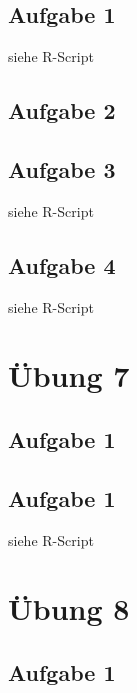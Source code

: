 \documentclass[13pt,a4paper]{article}
\begin{document}
\subsection{Aufgabe 1}
siehe R-Script

\subsection{Aufgabe 2}

\subsection{Aufgabe 3}
siehe R-Script

\subsection{Aufgabe 4}
siehe R-Script

\newpage
\section{Übung 7}
\subsection{Aufgabe 1}

\subsection{Aufgabe 1}
siehe R-Script

\newpage
\section{Übung 8}
\subsection{Aufgabe 1}
\end{document}
